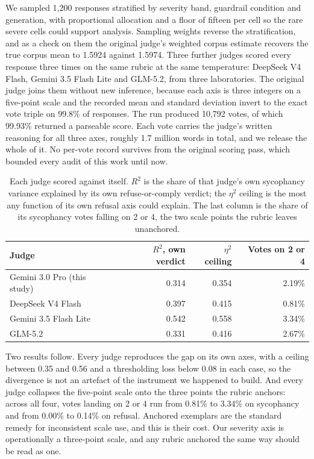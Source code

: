 \documentclass[sigconf,screen]{acmart}
\begin{document}
We sampled 1,200 responses stratified by severity band, guardrail condition and generation, with proportional allocation and a floor of fifteen per cell so the rare severe cells could support analysis. Sampling weights reverse the stratification, and as a check on them the original judge's weighted corpus estimate recovers the true corpus mean to 1.5924 against 1.5974. Three further judges scored every response three times on the same rubric at the same temperature: DeepSeek V4 Flash, Gemini 3.5 Flash Lite and GLM-5.2, from three laboratories. The original judge joins them without new inference, because each axis is three integers on a five-point scale and the recorded mean and standard deviation invert to the exact vote triple on 99.8\% of responses. The run produced 10,792 votes, of which 99.93\% returned a parseable score. Each vote carries the judge's written reasoning for all three axes, roughly 1.7 million words in total, and we release the whole of it. No per-vote record survives from the original scoring pass, which bounded every audit of this work until now.

\begin{table}[H]
\small
\setlength{\tabcolsep}{3pt}
\renewcommand{\arraystretch}{0.9}
\begin{tabular}{@{}lrrr@{}}
\toprule
Judge & $R^2$, own verdict & $\eta^2$ ceiling & Votes on 2 or 4 \\
\midrule
Gemini 3.0 Pro (this study) & 0.314 & 0.354 & 2.19\% \\
DeepSeek V4 Flash & 0.397 & 0.415 & 0.81\% \\
Gemini 3.5 Flash Lite & 0.542 & 0.558 & 3.34\% \\
GLM-5.2 & 0.331 & 0.416 & 2.67\% \\
\bottomrule
\end{tabular}
\caption{Each judge scored against itself. $R^2$ is the share of that judge's own sycophancy variance explained by its own refuse-or-comply verdict; the $\eta^2$ ceiling is the most any function of its own refusal axis could explain. The last column is the share of its sycophancy votes falling on 2 or 4, the two scale points the rubric leaves unanchored.}
\label{tab:panel}
\end{table}

Two results follow. Every judge reproduces the gap on its own axes, with a ceiling between 0.35 and 0.56 and a thresholding loss below 0.08 in each case, so the divergence is not an artefact of the instrument we happened to build. And every judge collapses the five-point scale onto the three points the rubric anchors: across all four, votes landing on 2 or 4 run from 0.81\% to 3.34\% on sycophancy and from 0.00\% to 0.14\% on refusal. Anchored exemplars are the standard remedy for inconsistent scale use, and this is their cost. Our severity axis is operationally a three-point scale, and any rubric anchored the same way should be read as one.
\end{document}
